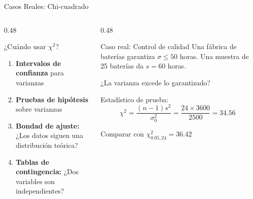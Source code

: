 \documentclass[10pt]{beamer}
\begin{document}
\begin{frame}{Casos Reales: Chi-cuadrado}
\begin{columns}[T]
\begin{column}{0.48\textwidth}
\begin{block}{¿Cuándo usar $\chi^2$?}
\begin{enumerate}
  \item \textbf{Intervalos de confianza} para varianzas
  \item \textbf{Pruebas de hipótesis} sobre varianzas
  \item \textbf{Bondad de ajuste:} ¿Los datos siguen una distribución teórica?
  \item \textbf{Tablas de contingencia:} ¿Dos variables son independientes?
\end{enumerate}
\end{block}
\end{column}
\begin{column}{0.48\textwidth}
\begin{exampleblock}{Caso real: Control de calidad}
\footnotesize
Una fábrica de baterías garantiza $\sigma \leq 50$ horas. Una muestra de 25 baterías da $s = 60$ horas.

¿La varianza excede lo garantizado?

Estadístico de prueba:
$$\chi^2 = \frac{(n-1)s^2}{\sigma_0^2} = \frac{24 \times 3600}{2500} = 34.56$$

Comparar con $\chi^2_{0.05, 24} = 36.42$
\end{exampleblock}
\end{column}
\end{columns}
\end{frame}
\end{document}

